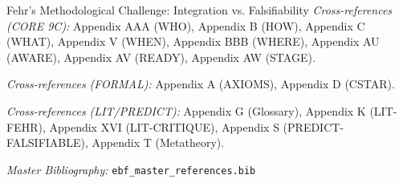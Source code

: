 \begin{chapter}{Fehr's Methodological Challenge: Integration vs. Falsifiability}
\noindent\textit{Cross-references (CORE 9C):}
Appendix AAA (WHO),
Appendix B (HOW),
Appendix C (WHAT),
Appendix V (WHEN),
Appendix BBB (WHERE),
Appendix AU (AWARE),
Appendix AV (READY),
Appendix AW (STAGE).

\noindent\textit{Cross-references (FORMAL):}
Appendix A (AXIOMS),
Appendix D (CSTAR).

\noindent\textit{Cross-references (LIT/PREDICT):}
Appendix G (Glossary),
Appendix K (LIT-FEHR),
Appendix XVI (LIT-CRITIQUE),
Appendix S (PREDICT-FALSIFIABLE),
Appendix T (Metatheory).

\noindent\textit{Master Bibliography:} \texttt{ebf\_master\_references.bib}

\nocite{bcm_master}

\end{chapter}

